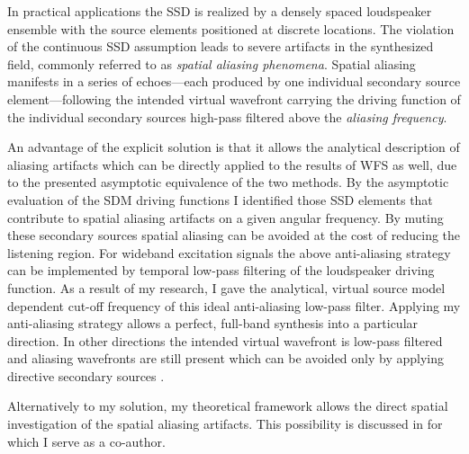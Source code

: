 \documentclass[10pt,twoside]{article}
\theoremstyle{thesisgroupstyle}
\theoremstyle{indented}
\begin{document}
\vspace{3mm}
In practical applications the SSD is realized by a densely spaced loudspeaker ensemble with the source elements positioned at discrete locations.
The violation of the continuous SSD assumption leads to severe artifacts in the synthesized field, commonly referred to as \emph{spatial aliasing phenomena}. 
Spatial aliasing manifests in a series of echoes---each produced by one individual secondary source element---following the intended virtual wavefront carrying the driving function of the individual secondary sources high-pass filtered above the \emph{aliasing frequency}.

An advantage of the explicit solution is that it allows the analytical description of aliasing artifacts which can be directly applied to the results of WFS as well, due to the presented asymptotic equivalence of the two methods.
By the asymptotic evaluation of the SDM driving functions I identified those SSD elements that contribute to spatial aliasing artifacts on a given angular frequency.
By muting these secondary sources spatial aliasing can be avoided at the cost of reducing the listening region.
For wideband excitation signals the above anti-aliasing strategy can be implemented by temporal low-pass filtering of the loudspeaker driving function.
As a result of my research, I gave the analytical, virtual source model dependent cut-off frequency of this ideal anti-aliasing low-pass filter.
Applying my anti-aliasing strategy allows a perfect, full-band synthesis into a particular direction.
In other directions the intended virtual wavefront is low-pass filtered and aliasing wavefronts are still present which can be avoided only by applying directive secondary sources \cite{Firtha2018_daga_a_booklet, Firtha2012:isma_booklet}.

Alternatively to my solution, my theoretical framework allows the direct spatial investigation of the spatial aliasing artifacts.
This possibility is discussed in \cite{8611109_booklet} for which I serve as a co-author.
\end{document}
